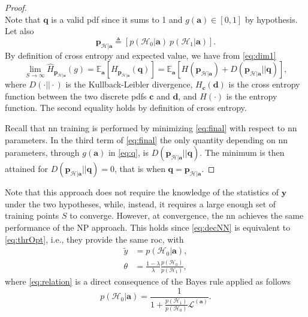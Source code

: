 \documentclass[conference,final]{IEEEtran}
\newcommand{\cross}[2]{H_{#1}(#2)}
\newcommand{\hatcross}[2]{\hat{H}_{#1}(#2)}
\newcommand{\gy}{g(\bm a)}
\newcommand{\E}[2]{\mathbb{E}_{#1}\left[#2\right]}
\begin{document}
\begin{proof}
\begin{subequations}
\end{subequations}
Note that $\bm q$ is a valid \ac{pdf} since it sums to 1 and $\gy \in [0,1]$ by hypothesis. Let also 
\begin{equation}
	\bm p_{\mathcal{H}|\bm a} \triangleq [p(\mathcal{H}_0|\bm a)\ p(\mathcal{H}_1|\bm a)].	
\end{equation}
By definition of cross entropy and expected value, we have from \eqref{eq:dim1}
\begin{equation}
\label{eq:final}
	\lim_{S \to \infty}	\hatcross{\bm p_{\mathcal{H}|\bm a}}{g} =	\E{\bm a}{ \cross{\bm p_{\mathcal{H}|\bm a}}{\bm q}} = 
		\E{\bm a}{H (\bm p_{\mathcal{H}|\bm a}) + D(\bm p_{\mathcal{H}|\bm a}||\bm q)},
\end{equation}
where $D(\cdot||\cdot)$ is the Kullback-Leibler divergence, $H_{\bm c}(\bm d)$ is the cross entropy function between the two discrete \acp{pdf} $\bm c$ and $\bm d$, and $H(\cdot)$ is the entropy function. The second equality holds by definition of cross entropy.

Recall that \ac{nn} training is performed by minimizing \eqref{eq:final} with respect to \ac{nn} parameters. In the third term of \eqref{eq:final} the only quantity depending on \ac{nn} parameters, through $\gy$ in \eqref{eq:q}, is $D(\bm p_{\mathcal{H}|\bm a}||\bm q)$. The minimum is then attained for $D(\bm p_{\mathcal{H}|\bm a}||\bm q)=0$, that is when $\bm q = \bm p_{\mathcal{H}|\bm a}$.
\end{proof}

Note that this approach does not require the knowledge of the statistics of $\bm{y}$ under the two hypotheses, while, instead, it requires a large enough set of training points $S$ to converge.
However, at convergence, the \ac{nn} achieves the same performance of the NP approach. This holds since \eqref{eq:decNN} is equivalent to \eqref{eq:thrOpt}, i.e., they provide the same \ac{roc}, with
\begin{align}
	\tilde{y} &= p(\mathcal{H}_0|\bm a), \\
	\label{eq:relation}
	\theta &= \frac{1-\lambda}{\lambda} \frac{p(\mathcal{H}_0)}{p(\mathcal{H}_1)},	
\end{align}  
where \eqref{eq:relation} is a direct consequence of the Bayes rule applied as follows 
\begin{equation}
	p(\mathcal{H}_0| \bm a) = \frac{1}{1+  \frac{p(\mathcal{H}_1)}{p(\mathcal{H}_0)} \mathcal{L}^{(\bm a)}}.	
\end{equation}
\end{document}
